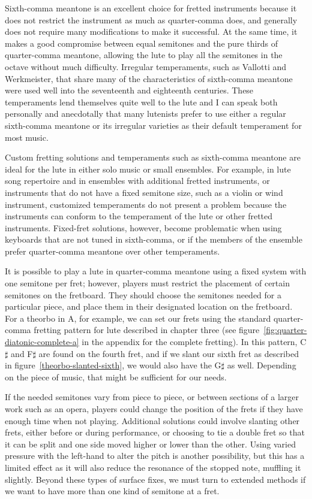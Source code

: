 Sixth-comma meantone is an excellent choice for fretted instruments because it does not restrict the
instrument as much as quarter-comma does, and generally does not require many modifications to make
it successful. At the same time, it makes a good compromise between equal semitones and the pure
thirds of quarter-comma meantone, allowing the lute to play all the semitones in the octave without
much difficulty. Irregular temperaments, such as Vallotti and Werkmeister, that share many of the
characteristics of sixth-comma meantone were used well into the seventeenth and eighteenth
centuries. These temperaments lend themselves quite well to the lute and I can speak both personally
and anecdotally that many lutenists prefer to use either a regular sixth-comma meantone or its
irregular varieties as their default temperament for most music.

Custom fretting solutions and temperaments such as sixth-comma meantone are ideal
for the lute in either solo music or small ensembles.  For example, in lute song
repertoire and in ensembles with additional fretted instruments, or instruments that do not
have a fixed semitone size, such as a violin or wind instrument, customized temperaments
do not present a problem because the instruments can conform to the temperament of
the lute or other fretted instruments. Fixed-fret solutions, however, become
problematic when using keyboards that are not tuned in sixth-comma, or if the members
of the ensemble prefer quarter-comma meantone over other temperaments.

It is possible to play a lute in quarter-comma meantone using a fixed system with one semitone per
fret; however, players must restrict the placement of certain semitones
on the fretboard.  They should choose the semitones needed for a particular
piece, and place them in their designated location on the fretboard.  For a theorbo
in A, for example, we can set our frets using the standard quarter-comma fretting
pattern for lute described in chapter three (see figure~\ref{fig:quarter-diatonic-complete-a}
in the appendix for the complete fretting).  In this pattern, C$\sharp$ and F$\sharp$
are found on the fourth fret, and if we slant our sixth fret as described in
figure~\ref{theorbo-slanted-sixth}, we would also have the G$\sharp$ as well. Depending
on the piece of music, that might be sufficient for our needs.

If the needed semitones vary from piece to piece, or between sections of a larger work
such as an opera, players could change the position of the frets if they have enough
time when not playing. Additional solutions could involve slanting
other frets, either before or during performance, or choosing to tie a double fret so
that it can be split and one side moved higher or lower than the other. Using varied
pressure with the left-hand to alter the pitch is another possibility, but this
has a limited effect as it will also reduce the resonance of the stopped note, muffling
it slightly. Beyond these types of surface fixes, we must turn to extended methods if
we want to have more than one kind of semitone at a fret.

